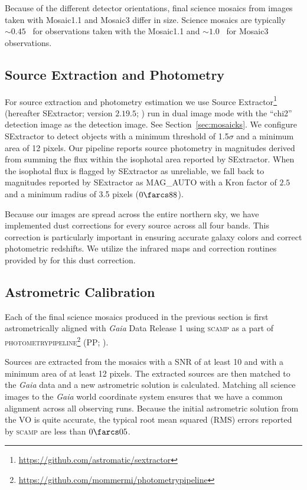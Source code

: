 \documentclass[apj, revtex4-1]{emulateapj}
\begin{document}
Because of the different detector orientations, final science mosaics from images taken with Mosaic1.1 and Mosaic3 differ in size. Science mosaics are typically $\sim0.45$ \degsq\ for observations taken with the Mosaic1.1 and $\sim1.0$ \degsq\ for Mosaic3 observations.

\subsection{Source Extraction and Photometry}\label{sec:sextractor}
For source extraction and photometry estimation we use Source Extractor\footnote{\url{https://github.com/astromatic/sextractor}} (hereafter SExtractor; version $2.19.5$; \citealt{Bertin1996}) run in dual image mode with the ``chi2'' detection image as the detection image. See Section~\ref{sec:mosaicks}. We configure SExtractor to detect objects with a minimum threshold of 1.5$\sigma$ and a minimum area of 12 pixels.
Our pipeline reports source photometry in magnitudes derived from summing the flux within the isophotal area reported by SExtractor. When the isophotal flux is flagged by SExtractor as unreliable, we fall back to magnitudes reported by SExtractor as \textsc{MAG\_AUTO} with a Kron factor \citep{Kron1980} of $2.5$ and a minimum radius of 3.5 pixels ($0\farcs88$).

Because our images are spread across the entire northern sky, we have implemented dust corrections for every source across all four bands. This correction is particularly important in ensuring accurate galaxy colors and correct photometric redshifts. We utilize the infrared maps and correction routines provided by \cite{Schlegel1998} for this dust correction.

\subsection{Astrometric Calibration}
Each of the final science mosaics produced in the previous section is first astrometrically aligned with \textit{Gaia} \citep{GaiaCollaboration2016} Data Release 1 \citep{GaiaCollaboration2016a} using \textsc{scamp} \citep{Bertin2006} as a part of \textsc{photometrypipeline}\footnote{\url{https://github.com/mommermi/photometrypipeline}} (PP; \citealt{Mommert2017}).

Sources are extracted from the mosaics with a SNR of at least 10 and with a minimum area of at least 12 pixels. The extracted sources are then matched to the \textit{Gaia} data and a new astrometric solution is calculated. Matching all science images to the \textit{Gaia} world coordinate system ensures that we have a common alignment across all observing runs. Because the initial astrometric solution from the VO is quite accurate, the
typical root mean squared (RMS) errors reported by \textsc{scamp} are less than $0\farcs05$.
\end{document}
